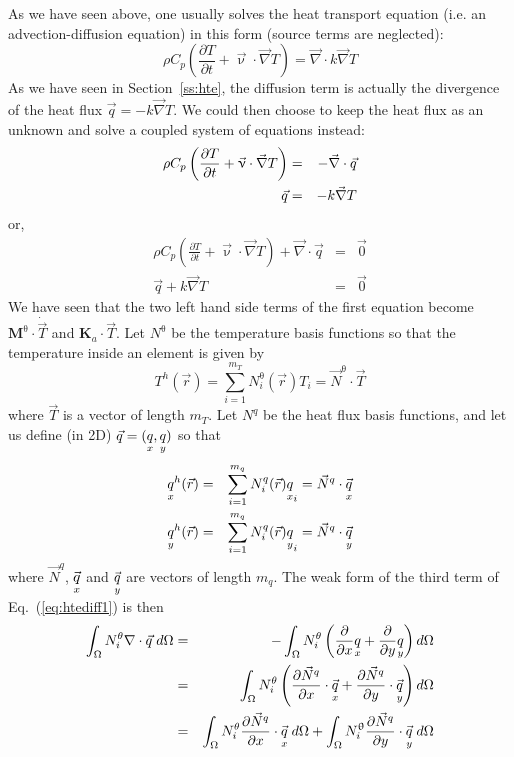 
As we have seen above, one usually solves the heat transport equation (i.e. 
an advection-diffusion equation) in this form (source terms are neglected):
\begin{equation}
\rho C_p \left( \frac{\partial T}{\partial t} + {\vec \upnu}\cdot {\vec\nabla T} \right)
= {\vec \nabla} \cdot k \vec\nabla T 
\end{equation}
As we have seen in Section~\ref{ss:hte}, the diffusion term is actually the divergence of the heat flux
$\vec{q}=-k \vec \nabla T$. We could then choose to keep the heat flux as an unknown and 
solve a coupled system of equations instead:
\begin{eqnarray}
\rho C_p \left( \frac{\partial T}{\partial t} + {\vec \upnu}\cdot {\vec\nabla T} \right)
&=& - {\vec \nabla} \cdot \vec{q} \nonumber\\ 
\vec{q} &=& - k \vec \nabla T \nonumber
\end{eqnarray}
or, 
\begin{eqnarray}
\rho C_p \left( \frac{\partial T}{\partial t} + {\vec \upnu}\cdot {\vec\nabla T} \right)
+ {\vec \nabla} \cdot \vec{q} &=& \vec{0} \label{eq:htediff1}\\ 
\vec{q} + k \vec \nabla T &=& \vec{0} \label{eq:htediff2}
\end{eqnarray}
We have seen that the two left hand side terms of the first equation become 
${\bm M}^\uptheta \cdot \dot{\vec{T}}$ and ${\bm K}_a \cdot \vec{T}$.
Let $N^\uptheta$ be the temperature basis functions so that the temperature inside an element is 
given by
\begin{equation}
T^h({\vec r}) = \sum_{i=1}^{m_T} N^\uptheta_i ({\vec r}) T_i = \vec N^\uptheta \cdot \vec T
\end{equation}
where $\vec T$ is a vector of length $m_T$.
Let $N^q$ be the heat flux basis functions, and let us define (in 2D) $\vec{q}=(\underset{\tiny x}{q},\underset{\tiny y}{q})$ so that 
\begin{eqnarray}
\underset{\tiny x}{q}^h({\vec r}) &=& \sum_{i=1}^{m_q} N^q_i ({\vec r}) \underset{\tiny x}{q}_i = \vec{N}^q \cdot \vec{\underset{\tiny x}{q}} \\
\underset{\tiny y}{q}^h({\vec r}) &=& \sum_{i=1}^{m_q} N^q_i ({\vec r}) \underset{\tiny y}{q}_i = \vec{N}^q \cdot \vec{\underset{\tiny y}{q}} 
\end{eqnarray}
where $\vec{N}^q$, $\vec{\underset{\tiny x}{q}}$ and $\vec{\underset{\tiny y}{q}}$ are vectors of length $m_q$.
The weak form of the third term of Eq.~(\ref{eq:htediff1}) is then
\begin{eqnarray}
\int_\Omega N_i^\theta  \nabla \cdot \vec{q} \;  d\Omega
&=& -\int_\Omega N_i^\theta  
\left(  \frac{\partial }{\partial x}\underset{\tiny x}{q} + \frac{\partial }{\partial y}\underset{\tiny y}{q} \right) d\Omega \nonumber\\
&=& \int_\Omega N_i^\theta  \left(  \frac{\partial \vec{N}^q}{\partial x}\cdot \vec{\underset{\tiny x}{q}}
+  \frac{\partial \vec{N}^q}{\partial y}\cdot \vec{\underset{\tiny y}{q}} \right) d\Omega \nonumber\\
&=& \int_\Omega N_i^\theta  \frac{\partial \vec{N}^q}{\partial x}\cdot  \vec{\underset{\tiny x}{q}} \;  d\Omega + 
\int_\Omega  N_i^\uptheta \frac{\partial \vec{N}^q}{\partial y} \cdot \vec{\underset{\tiny y}{q}} \;  d\Omega \nonumber
\end{eqnarray}
